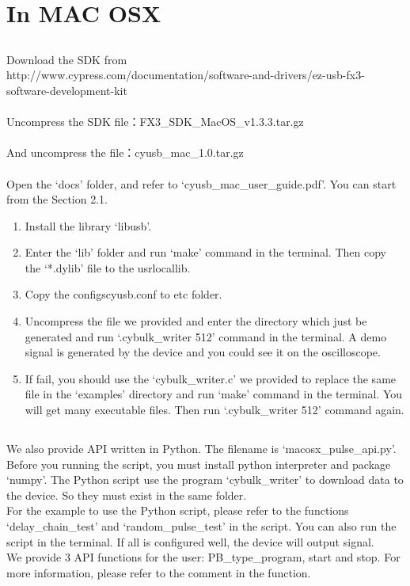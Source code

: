 \chapter{\heiti In MAC OSX}
\section{}

\noindent Download the SDK from 
\\{http://www.cypress.com/documentation/software-and-drivers/ez-usb-fx3-software-development-kit}
\\ \\
Uncompress the SDK file：FX3\_SDK\_MacOS\_v1.3.3.tar.gz
\\ \\ 
And uncompress the file：cyusb\_mac\_1.0.tar.gz
\\ \\
Open the `docs' folder, and refer to `cyusb\_mac\_user\_guide.pdf'. You can start from the Section 2.1.

\begin{enumerate}
\item Install the library `libusb'.
\item Enter the `lib' folder and run `make' command in the terminal. Then copy the `*.dylib' file to the \/usr\/local\/lib.
\item Copy the configs\/cyusb.conf to \/etc folder.
\item Uncompress the file we provided and enter the directory which just be generated and run `.\/cybulk\_writer 512' command in the terminal. A demo signal is generated by the device and you could see it on the oscilloscope.
\item If fail, you should use the `cybulk\_writer.c' we provided to replace the same file in the  `examples' directory and run `make' command in the terminal. You will get many executable files. Then run `.\/cybulk\_writer 512' command again.
\end{enumerate}

\section{}

We also provide API written in Python. The filename is `macosx\_pulse\_api.py'. Before you running the script, you must install python interpreter and package `numpy'. The Python script use the program `cybulk\_writer' to download data to the device. So they must exist in the same folder.
\\
\indent For the example to use the Python script, please refer to the functions `delay\_chain\_test' and `random\_pulse\_test' in the script. You can also run the script in the terminal. If all is configured well, the device will output signal.
\\
\indent We provide 3 API functions for the user: PB\_type\_program, start and stop. For more information, please refer to the comment in the function.
\\

